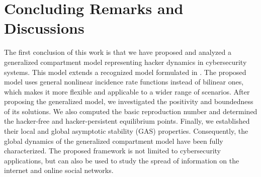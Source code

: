 \documentclass[11pt]{article}
\theoremstyle{definition}
\theoremstyle{remark}
\numberwithin{equation}{section}
\begin{document}

\section{Concluding Remarks and Discussions}
The first conclusion of this work is that we have proposed and analyzed a generalized compartment model representing hacker dynamics in cybersecurity systems. 
This model extends a recognized model formulated in \cite{Hassouni}.
The proposed model uses general nonlinear incidence rate functions instead of bilinear ones, which makes it more flexible and applicable to a wider range of scenarios.  
After proposing the generalized model, we investigated the positivity and boundedness of its solutions. 
We also computed the basic reproduction number and determined the hacker-free and hacker-persistent equilibrium points. 
Finally, we established their local and global asymptotic stability (GAS) properties. 
Consequently, the global dynamics of the generalized compartment model have been fully characterized. 
The proposed framework is not limited to cybersecurity applications, but can also be used to study the spread of information on the internet and online social networks.
\end{document}

